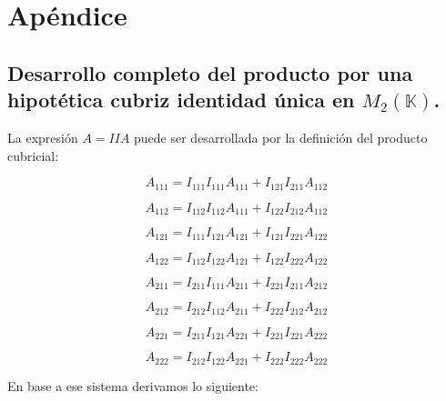 
\appendix
\section{Apéndice} \label{appendix}

\subsection{Desarrollo completo del producto por una hipotética cubriz identidad única en $M_2 (\mathbb{K})$.} \label{appendix-1}

La expresión $A = IIA$ puede ser desarrollada por la definición del producto cubricial:

\begin{equation}
A_{111} = I_{111} I_{111} A_{111} + I_{121} I_{211} A_{112}
\end{equation}

\begin{equation}
A_{112} = I_{112} I_{112} A_{111} + I_{122} I_{212} A_{112}
\end{equation}

\begin{equation}
A_{121} = I_{111} I_{121} A_{121} + I_{121} I_{221} A_{122}
\end{equation}

\begin{equation}
A_{122} = I_{112} I_{122} A_{121} + I_{122} I_{222} A_{122}
\end{equation}

\begin{equation}
A_{211} = I_{211} I_{111} A_{211} + I_{221} I_{211} A_{212}
\end{equation}

\begin{equation}
A_{212} = I_{212} I_{112} A_{211} + I_{222} I_{212} A_{212}
\end{equation}

\begin{equation}
A_{221} = I_{211} I_{121} A_{221} + I_{221} I_{221} A_{222}
\end{equation}

\begin{equation}
A_{222} = I_{212} I_{122} A_{221} + I_{222} I_{222} A_{222}
\end{equation}

En base a ese sistema derivamos lo siguiente:

